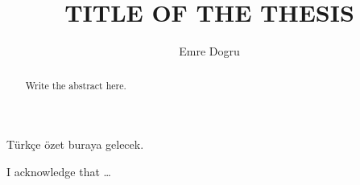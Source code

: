 \documentclass{buthesis}
\title{TITLE OF THE THESIS}
\author{Emre Dogru}
\begin{document}
\titlepageMS %
\signaturepageMS %

\thispagestyle{plain}
\begin{abstract}
Write the abstract here.
\end{abstract}

\begin{ozet}
 T\"urk\c ce \"ozet buraya gelecek. 
\end{ozet}

\begin{ack}
 I acknowledge that \ldots
\end{ack}

\tableofcontents
\listoffigures
\listoftables
\newpage
\newpage
%
\newpage 
\pagestyle{headings}
\makeatother
\end{document}

